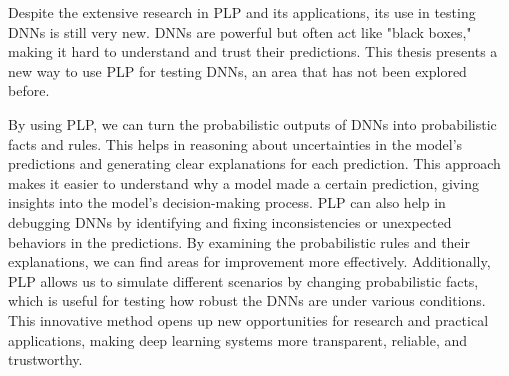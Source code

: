 Despite the extensive research in PLP and its applications, its use in testing DNNs is still very new. DNNs are powerful but often act like "black boxes," making it hard to understand and trust their predictions. This thesis presents a new way to use PLP for testing DNNs, an area that has not been explored before.

By using PLP, we can turn the probabilistic outputs  of DNNs into probabilistic facts and rules. This helps in reasoning about uncertainties in the model's predictions and generating clear explanations for each prediction. This approach makes it easier to understand why a model made a certain prediction, giving insights into the model’s decision-making process. PLP can also help in debugging DNNs by identifying and fixing inconsistencies or unexpected behaviors in the predictions. By examining the probabilistic rules and their explanations, we can find areas for improvement more effectively. Additionally, PLP allows us to simulate different scenarios by changing probabilistic facts, which is useful for testing how robust the DNNs are under various conditions. This innovative method opens up new opportunities for research and practical applications, making deep learning systems more transparent, reliable, and trustworthy.








